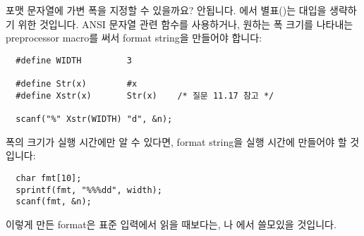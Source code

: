 \begin{faq}
	 포맷 문자열에 가변 폭을 지정할 수 있을까요?
\A
	안됩니다.  에서 별표(\TT{*})는
	대입을 생략하기 위한 것입니다.
	ANSI 문자열 관련 함수를 사용하거나, 
	원하는 폭 크기를 나타내는 preprocessor macro를 써서 
	format string을 만들어야 합니다:

\begin{verbatim}
  #define WIDTH         3

  #define Str(x)        #x
  #define Xstr(x)       Str(x)    /* 질문 11.17 참고 */

  scanf("%" Xstr(WIDTH) "d", &n);
\end{verbatim}

	폭의 크기가 실행 시간에만 알 수 있다면, format string을 실행 시간에
	만들어야 할 것입니다:

\begin{verbatim}
  char fmt[10];
  sprintf(fmt, "%%%dd", width);
  scanf(fmt, &n);
\end{verbatim}

	이렇게 만든  format은 표준 입력에서 읽을 때보다는,
	나 에서 쓸모있을 것입니다.
\end{faq}

